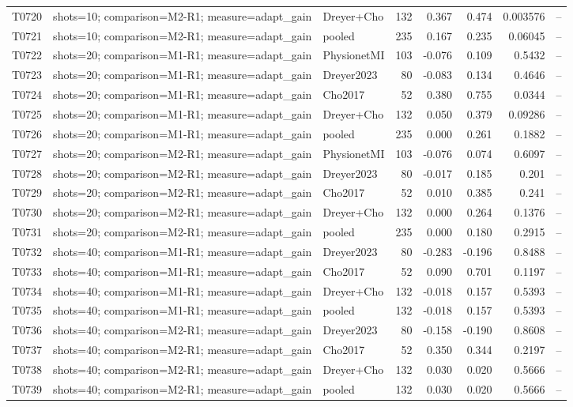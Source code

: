 \begin{longtable}{p{.45in}p{2.6in}p{.75in}rrrrr}
T0720 & shots=10; comparison=M2-R1; measure=adapt\_\allowbreak{}gain & Dreyer+Cho & 132 & 0.367 & 0.474 & 0.003576 & -- \\
T0721 & shots=10; comparison=M2-R1; measure=adapt\_\allowbreak{}gain & pooled & 235 & 0.167 & 0.235 & 0.06045 & -- \\
T0722 & shots=20; comparison=M1-R1; measure=adapt\_\allowbreak{}gain & PhysionetMI & 103 & -0.076 & 0.109 & 0.5432 & -- \\
T0723 & shots=20; comparison=M1-R1; measure=adapt\_\allowbreak{}gain & Dreyer2023 & 80 & -0.083 & 0.134 & 0.4646 & -- \\
T0724 & shots=20; comparison=M1-R1; measure=adapt\_\allowbreak{}gain & Cho2017 & 52 & 0.380 & 0.755 & 0.0344 & -- \\
T0725 & shots=20; comparison=M1-R1; measure=adapt\_\allowbreak{}gain & Dreyer+Cho & 132 & 0.050 & 0.379 & 0.09286 & -- \\
T0726 & shots=20; comparison=M1-R1; measure=adapt\_\allowbreak{}gain & pooled & 235 & 0.000 & 0.261 & 0.1882 & -- \\
T0727 & shots=20; comparison=M2-R1; measure=adapt\_\allowbreak{}gain & PhysionetMI & 103 & -0.076 & 0.074 & 0.6097 & -- \\
T0728 & shots=20; comparison=M2-R1; measure=adapt\_\allowbreak{}gain & Dreyer2023 & 80 & -0.017 & 0.185 & 0.201 & -- \\
T0729 & shots=20; comparison=M2-R1; measure=adapt\_\allowbreak{}gain & Cho2017 & 52 & 0.010 & 0.385 & 0.241 & -- \\
T0730 & shots=20; comparison=M2-R1; measure=adapt\_\allowbreak{}gain & Dreyer+Cho & 132 & 0.000 & 0.264 & 0.1376 & -- \\
T0731 & shots=20; comparison=M2-R1; measure=adapt\_\allowbreak{}gain & pooled & 235 & 0.000 & 0.180 & 0.2915 & -- \\
T0732 & shots=40; comparison=M1-R1; measure=adapt\_\allowbreak{}gain & Dreyer2023 & 80 & -0.283 & -0.196 & 0.8488 & -- \\
T0733 & shots=40; comparison=M1-R1; measure=adapt\_\allowbreak{}gain & Cho2017 & 52 & 0.090 & 0.701 & 0.1197 & -- \\
T0734 & shots=40; comparison=M1-R1; measure=adapt\_\allowbreak{}gain & Dreyer+Cho & 132 & -0.018 & 0.157 & 0.5393 & -- \\
T0735 & shots=40; comparison=M1-R1; measure=adapt\_\allowbreak{}gain & pooled & 132 & -0.018 & 0.157 & 0.5393 & -- \\
T0736 & shots=40; comparison=M2-R1; measure=adapt\_\allowbreak{}gain & Dreyer2023 & 80 & -0.158 & -0.190 & 0.8608 & -- \\
T0737 & shots=40; comparison=M2-R1; measure=adapt\_\allowbreak{}gain & Cho2017 & 52 & 0.350 & 0.344 & 0.2197 & -- \\
T0738 & shots=40; comparison=M2-R1; measure=adapt\_\allowbreak{}gain & Dreyer+Cho & 132 & 0.030 & 0.020 & 0.5666 & -- \\
T0739 & shots=40; comparison=M2-R1; measure=adapt\_\allowbreak{}gain & pooled & 132 & 0.030 & 0.020 & 0.5666 & -- \\
\bottomrule
\end{longtable}
